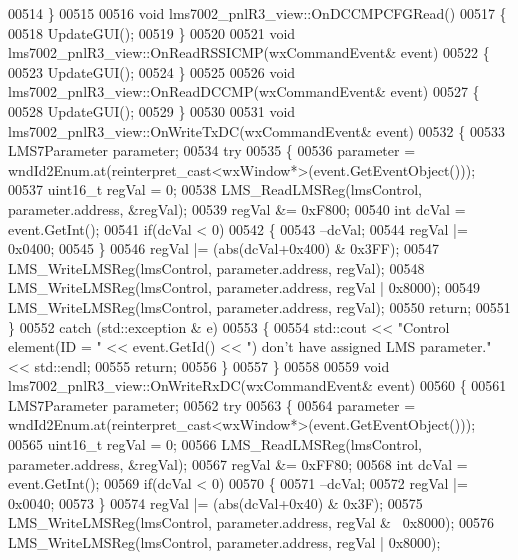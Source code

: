 \begin{DoxyCode}
{{{{{00514 \}
00515 
00516 \textcolor{keywordtype}{void} lms7002_pnlR3_view::OnDCCMPCFGRead()
00517 \{
00518     UpdateGUI();
00519 \}
00520 
00521 \textcolor{keywordtype}{void} lms7002_pnlR3_view::OnReadRSSICMP(wxCommandEvent& event)
00522 \{
00523     UpdateGUI();
00524 \}
00525 
00526 \textcolor{keywordtype}{void} lms7002_pnlR3_view::OnReadDCCMP(wxCommandEvent& event)
00527 \{
00528     UpdateGUI();
00529 \}
00530 
00531 \textcolor{keywordtype}{void} lms7002_pnlR3_view::OnWriteTxDC(wxCommandEvent& event)
00532 \{
00533     LMS7Parameter parameter;
00534     \textcolor{keywordflow}{try}
00535     \{
00536         parameter = wndId2Enum.at(reinterpret\_cast<wxWindow*>(event.GetEventObject()));
00537         uint16\_t regVal = 0;
00538         LMS_ReadLMSReg(lmsControl, parameter.address, &regVal);
00539         regVal &= 0xF800;
00540         \textcolor{keywordtype}{int} dcVal = \textcolor{keyword}{event}.GetInt();
00541         \textcolor{keywordflow}{if}(dcVal < 0)
00542         \{
00543             --dcVal;
00544             regVal |= 0x0400;
00545         \}
00546         regVal |= (abs(dcVal+0x400) & 0x3FF);
00547         LMS_WriteLMSReg(lmsControl, parameter.address, regVal);
00548         LMS_WriteLMSReg(lmsControl, parameter.address, regVal | 0x8000);
00549         LMS_WriteLMSReg(lmsControl, parameter.address, regVal);
00550         \textcolor{keywordflow}{return};
00551     \}
00552     \textcolor{keywordflow}{catch} (std::exception & e)
00553     \{
00554         std::cout << \textcolor{stringliteral}{"Control element(ID = "} << \textcolor{keyword}{event}.GetId() << \textcolor{stringliteral}{") don't have assigned LMS parameter."} << 
      std::endl;
00555         \textcolor{keywordflow}{return};
00556     \}
00557 \}
00558 
00559 \textcolor{keywordtype}{void} lms7002_pnlR3_view::OnWriteRxDC(wxCommandEvent& event)
00560 \{
00561     LMS7Parameter parameter;
00562     \textcolor{keywordflow}{try}
00563     \{
00564         parameter = wndId2Enum.at(reinterpret\_cast<wxWindow*>(event.GetEventObject()));
00565         uint16\_t regVal = 0;
00566         LMS_ReadLMSReg(lmsControl, parameter.address, &regVal);
00567         regVal &= 0xFF80;
00568         \textcolor{keywordtype}{int} dcVal = \textcolor{keyword}{event}.GetInt();
00569         \textcolor{keywordflow}{if}(dcVal < 0)
00570         \{
00571             --dcVal;
00572             regVal |= 0x0040;
00573         \}
00574         regVal |= (abs(dcVal+0x40) & 0x3F);
00575         LMS_WriteLMSReg(lmsControl, parameter.address, regVal & ~0x8000);
00576         LMS_WriteLMSReg(lmsControl, parameter.address, regVal | 0x8000);
}}}}}
\end{DoxyCode}
